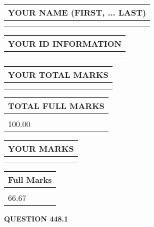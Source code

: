 \documentclass{ctexart}
\begin{document}
   
   
   
\newpage 
\setcounter{page}{ 
   448001 } 
   
   
   
   
\noindent\begin{tabular}{|l|}
\hline
YOUR NAME (FIRST, ... LAST)  \\
\hline
 \\ 
 \\ 
\hline
\end{tabular}
\hspace{0.05in} \begin{tabular}{|l|}
\hline
 YOUR   ID   INFORMATION  \\
\hline
 \\ 
 \\ 
\hline
\end{tabular}
   
   
\vspace{0.2in}\noindent\begin{tabular}{|l|}
\hline
YOUR TOTAL MARKS  \\
\hline
 \\ 
 \\ 
\hline
\end{tabular}
\hspace{0.05in} \begin{tabular}{|l|}
\hline
TOTAL FULL MARKS  \\
\hline
 \\ 
100.00 \\
\hline
\end{tabular}
   
   
 \vspace{0.2in}
 
 
 
 
   
   
  
\vspace{0.2in}
  
\noindent\begin{tabular}{|l|}
\hline
 YOUR MARKS  \\
\hline
 \\ 
 \\ 
\hline
\end{tabular}
\hspace{0.05in} \begin{tabular}{|l|}
\hline
 Full Marks  \\
\hline
 \\ 
66.67 \\
\hline
\end{tabular}
{\textbf{\Large{QUESTION
448.1 
}}}
  
\end{document}
